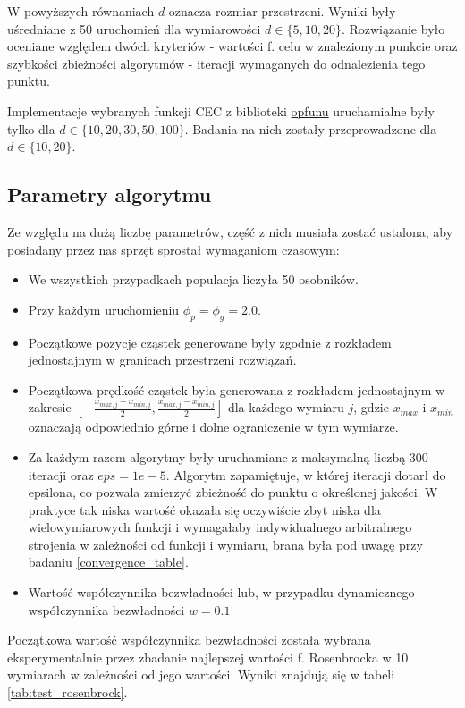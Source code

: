 \documentclass[12pt]{article}
\begin{document}
W powyższych równaniach \(d\) oznacza rozmiar przestrzeni. Wyniki były uśredniane z 50 uruchomień dla wymiarowości \(d \in \{5, 10, 20\}\).
Rozwiązanie było oceniane względem dwóch kryteriów - wartości f. celu w znalezionym punkcie oraz szybkości
zbieżności algorytmów - iteracji wymaganych do odnalezienia tego punktu.

Implementacje wybranych funkcji CEC z biblioteki \href{https://github.com/thieu1995/opfunu}{opfunu} uruchamialne
były tylko dla $d \in \{ 10, 20, 30, 50, 100 \}$. Badania na nich zostały przeprowadzone dla $d \in \{ 10, 20 \}$.

\subsection{Parametry algorytmu}
Ze względu na dużą liczbę parametrów, część z nich musiała zostać ustalona, aby posiadany przez nas sprzęt sprostał wymaganiom czasowym:

\begin{itemize}
	\item We wszystkich przypadkach populacja liczyła 50 osobników.
	\item Przy każdym uruchomieniu $\phi_p = \phi_g = 2.0$.
	\item Początkowe pozycje cząstek generowane były zgodnie z rozkładem jednostajnym w granicach przestrzeni rozwiązań.
	\item Początkowa prędkość cząstek była generowana z rozkładem jednostajnym w zakresie $[-\frac{x_{max, j}-x_{min, j}}{2}, \frac{x_{max, j}-x_{min, j}}{2}]$ dla każdego wymiaru \(j\), gdzie $x_{max}$ i $x_{min}$ oznaczają odpowiednio
	      górne i dolne ograniczenie w tym wymiarze.
	\item Za każdym razem algorytmy były uruchamiane z maksymalną liczbą 300 iteracji oraz $eps = 1e-5$. Algorytm zapamiętuje,
	      w której iteracji dotarł do epsilona, co pozwala zmierzyć zbieżność do punktu o określonej jakości. W praktyce tak niska
	      wartość okazała się oczywiście zbyt niska dla wielowymiarowych funkcji i wymagałaby indywidualnego arbitralnego strojenia
	      w zależności od funkcji i wymiaru, brana była pod uwagę przy badaniu \ref{convergence_table}.
	\item Wartość współczynnika bezwładności lub, w przypadku dynamicznego współczynnika bezwładności $w = 0.1$
\end{itemize}

Początkowa wartość współczynnika bezwładności została wybrana eksperymentalnie przez zbadanie najlepszej wartości f. Rosenbrocka w 10 wymiarach w zależności od
jego wartości. Wyniki znajdują się w tabeli \ref{tab:test_rosenbrock}.
\end{document}
